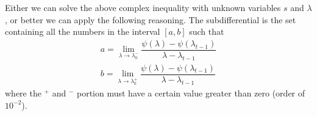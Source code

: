 \documentclass[notitlepage]{article}
\begin{document}
Either we can solve the above complex inequality with unknown variables $s$ and $\lambda$, or better we can apply the following reasoning. The subdifferential is the set containing all the numbers in the 
interval $\left[a,b\right]$ such that
\begin{align*}
  a = \lim_{\lambda \rightarrow \lambda_0^-} \dfrac{\psi(\lambda) - \psi(\lambda_{t-1})}{\lambda - \lambda_{t-1}} \\
  b = \lim_{\lambda \rightarrow \lambda_0^+} \dfrac{\psi(\lambda) - \psi(\lambda_{t-1})}{\lambda - \lambda_{t-1}}
\end{align*}
where the $^+$ and $^-$ portion must have a certain value greater than zero (order of $10^{-2}$).
\end{document}
